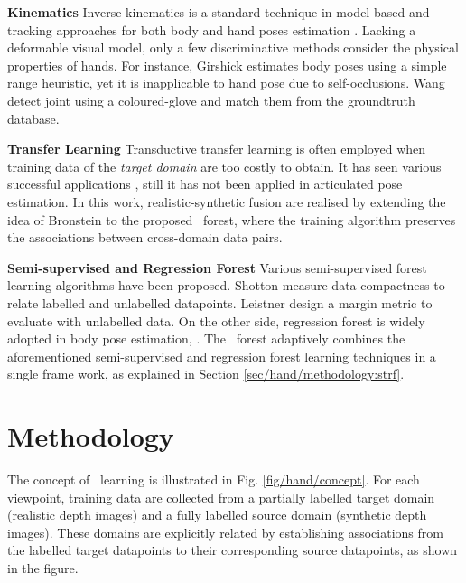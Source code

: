 \noindent\textbf{Kinematics}   
Inverse kinematics is a standard technique in model-based and tracking approaches for both body \cite{Yao2012, Pons-Moll2011} and hand poses estimation \cite{LaGorce2011, Oikonomidis2012, Stenger2006}. Lacking a deformable visual model, only a few discriminative methods consider the physical properties of hands. For instance, Girshick \etal \cite{Girshick2011} estimates body poses using a simple range heuristic, yet it is inapplicable to hand pose due to self-occlusions.  
Wang \etal \cite{Wang2009} detect joint using a coloured-glove and match them from the groundtruth database. 

\noindent\textbf{Transfer Learning} 
Transductive transfer learning is often employed when training data of the \emph{target domain} are too costly to obtain. It has seen various successful applications \cite{Pan2010}, still it has not been applied in articulated pose estimation. In this work, realistic-synthetic fusion are realised by extending the idea of Bronstein \etal \cite{Bronstein2010} to the proposed \STR\ forest, where the training algorithm preserves the associations between cross-domain data pairs.

\noindent\textbf{Semi-supervised and Regression Forest} Various semi-supervised forest learning algorithms have been proposed. Shotton \etal \cite{Shotton2013} measure data compactness to relate labelled and unlabelled datapoints. Leistner \etal \cite{Leistner2009} design a margin metric to evaluate with unlabelled data. On the other side, regression forest is widely adopted in body pose estimation, \eg \cite{Girshick2011, Sun2012}. The \STR\ forest adaptively combines the aforementioned semi-supervised and regression forest learning techniques in a single frame work, as explained in Section \ref{sec/hand/methodology:strf}.


\section{Methodology}

The concept of \STR\ learning is illustrated in Fig. \ref{fig/hand/concept}. 
For each viewpoint, training data are collected from a partially labelled target domain (realistic depth images) and a fully labelled source domain (synthetic depth images). These domains are explicitly related by establishing associations from the labelled target datapoints to their corresponding source datapoints, as shown in the figure. 

